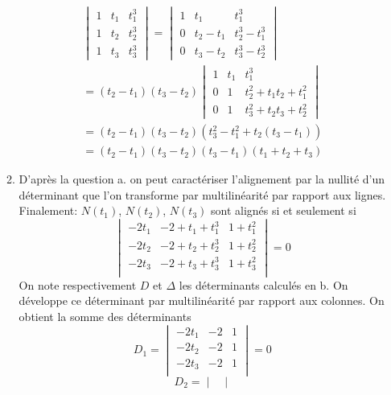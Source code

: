 \begin{enumerate}
\begin{enumerate}
\begin{multline*}
  \begin{vmatrix}
  1 & t_1 & t_1^3 \\ 1 & t_2 & t_2^3 \\ 1 & t_3 & t_3^3 
 \end{vmatrix}
=
  \begin{vmatrix}
  1 & t_1 & t_1^3 \\ 0 & t_2-t_1 & t_2^3-t_1^3 \\ 0 & t_3-t_2 & t_3^3-t_2^3 
 \end{vmatrix}\\
= (t_2-t_1)(t_3-t_2)
  \begin{vmatrix}
  1 & t_1 & t_1^3 \\ 0 & 1 & t_2^2+t_1t_2+t_1^2 \\ 0 & 1 & t_3^2+t_2t_3+t_2^2 
 \end{vmatrix} \\
= (t_2-t_1)(t_3-t_2)\left(t_3^2-t_1^2 +t_2(t_3-t_1)\right)\\
=  (t_2-t_1)(t_3-t_2)(t_3-t_1)(t_1+t_2+t_3)
\end{multline*}
 \item D'après la question a. on peut caractériser l'alignement par la nullité d'un déterminant que l'on transforme par multilinéarité par rapport aux lignes. Finalement: $N(t_1)$, $N(t_2)$, $N(t_3)$ sont alignés si et seulement si
\begin{displaymath}
 \begin{vmatrix}
  -2t_1 & -2+t_1+t_1^3 & 1+t_1^2 \\
  -2t_2 & -2+t_2+t_2^3 & 1+t_2^2 \\
  -2t_3 & -2+t_3+t_3^3 & 1+t_3^2 \\
 \end{vmatrix}
=0
\end{displaymath}
On note respectivement $D$ et $\Delta$ les déterminants calculés en b.
On développe ce déterminant par multilinéarité par rapport aux colonnes. On obtient la somme des déterminants
\begin{displaymath}
D_1=
 \begin{vmatrix}
  -2t_1 & -2 & 1 \\
  -2t_2 & -2 & 1 \\
  -2t_3 & -2 & 1 \\
 \end{vmatrix}
=0
\end{displaymath}
\begin{displaymath}
D_2=
 \begin{vmatrix}

\end{vmatrix}
\end{displaymath}
\end{enumerate}
\end{enumerate}
